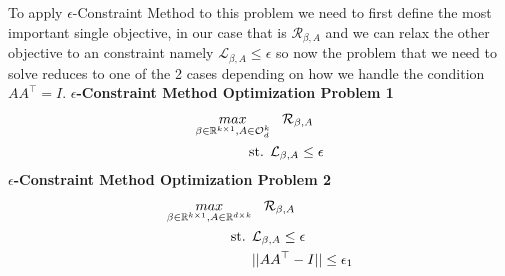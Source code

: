 To apply $\epsilon$-Constraint Method to this problem we need to first define the most important single objective, in our case that is $\mathcal{R}_{\beta, A}$ and we can relax the other objective to an constraint namely $\mathcal{L}_{\beta, A} \le \epsilon$ so now the problem that we need to solve reduces to one of the 2 cases depending on how we handle the condition $AA^\top = I$.
\newline \textbf{$\epsilon$-Constraint Method Optimization Problem 1}
\begin{equation} \label{ECMOP_1}
\begin{aligned}
    \underset{\beta\in \mathbb{R}^{k\times 1},A\in \mathcal{O}^{k}_{d}}{max}& \hspace{3mm} \mathcal{R}_{\beta, A}\\
    \text{st.  }& \mathcal{L}_{\beta, A} \le \epsilon
\end{aligned}
\end{equation}
\newline \textbf{$\epsilon$-Constraint Method Optimization Problem 2}
\begin{equation} \label{ECMOP_2}
\begin{aligned}
    \underset{\beta\in \mathbb{R}^{k\times 1},A\in \mathbb{R}^{d\times k}}{max}& \hspace{3mm} \mathcal{R}_{\beta, A}\\
    \text{st.  }& \mathcal{L}_{\beta, A} \le \epsilon\\
     & ||AA^\top - I|| \le \epsilon_1
\end{aligned}
\end{equation}

